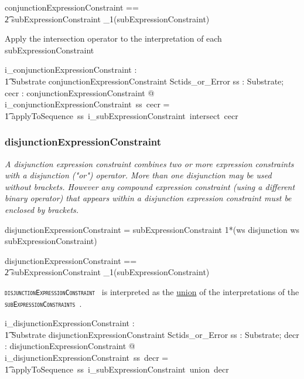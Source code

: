 \documentclass{article}
\def\spec#1{{\tt \small \textsc{{#1}} }}
\def\bnf#1{{\scriptsize {{#1}} }}
\def\desc#1{{\small \textsl{{#1}} }}
\begin{document}
\begin{zed}
conjunctionExpressionConstraint == \\
\t2 subExpressionConstraint \cross \seq_1(subExpressionConstraint)
\end{zed}

Apply the intersection operator to the interpretation of each  subExpressionConstraint

\begin{gendef}
    i\_conjunctionExpressionConstraint : \\
\t1 Substrate \fun conjunctionExpressionConstraint \fun Sctids\_or\_Error
\where
   \forall ss : Substrate;  cecr : conjunctionExpressionConstraint @ \\
i\_conjunctionExpressionConstraint~ss~cecr = \\
\t1 applyToSequence~ss~i\_subExpressionConstraint~intersect~cecr
\end{gendef}

\subsubsection{disjunctionExpressionConstraint}
\begin{framed}
\desc{A disjunction expression constraint combines two or more expression constraints with a disjunction ("or") operator. More than one disjunction may be used without brackets. However any compound expression constraint (using a different binary operator) that appears within a disjunction expression constraint must be enclosed by brackets.}
\end{framed}

\begin{framed}
\noindent
\bnf{disjunctionExpressionConstraint = subExpressionConstraint 1*(ws disjunction ws subExpressionConstraint)}
\end{framed}

\begin{zed}
disjunctionExpressionConstraint == \\
\t2 subExpressionConstraint \cross \seq_1(subExpressionConstraint)
\end{zed}

\spec{disjunctionExpressionConstraint} is interpreted as the \underline{union} of the interpretations of the
\spec{subExpressionConstraints}.

\begin{gendef}
    i\_disjunctionExpressionConstraint : \\
\t1 Substrate \fun disjunctionExpressionConstraint \fun Sctids\_or\_Error
\where
   \forall ss : Substrate;  decr : disjunctionExpressionConstraint @ \\
i\_disjunctionExpressionConstraint~ss~decr = \\
\t1 applyToSequence~ss~i\_subExpressionConstraint~union~decr
\end{gendef}
\end{document}

